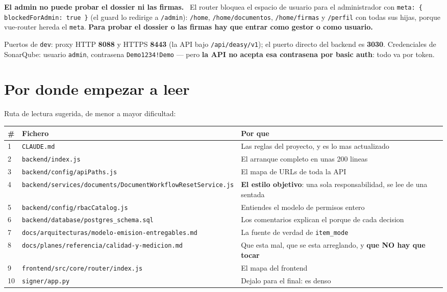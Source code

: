\documentclass[11pt,a4paper,oneside]{report}
\newenvironment{aviso}[1][Aviso]{%
  \par\medskip
  \colorlet{shadecolor}{orange!14}%
  \begin{shaded}\noindent\textbf{\color{orange!45!black}#1.}\ \ignorespaces}%
  {\end{shaded}\par\medskip}
\newcommand{\rt}[1]{\texttt{#1}}
\begin{document}
\begin{aviso}[El admin no puede probar el dossier ni las firmas]
El router bloquea el espacio de usuario para el administrador con
\rt{meta: \{ blockedForAdmin: true \}} (el guard lo redirige a \rt{/admin}): \rt{/home},
\rt{/home/documentos}, \rt{/home/firmas} y \rt{/perfil} con todas sus hijas, porque vue-router
hereda el \rt{meta}. \textbf{Para probar el dossier o las firmas hay que entrar como gestor o
como usuario.}
\end{aviso}

Puertos de \rt{dev}: proxy HTTP \textbf{8088} y HTTPS \textbf{8443} (la API bajo
\rt{/api/deasy/v1}); el puerto directo del backend es \textbf{3030}. Credenciales de SonarQube:
usuario \rt{admin}, contrasena \rt{Demo1234!Demo} --- pero \textbf{la API no acepta esa
contrasena por basic auth}: todo va por token.

\chapter{Por donde empezar a leer}

Ruta de lectura sugerida, de menor a mayor dificultad:

\begin{center}
\footnotesize
\begin{tabularx}{\textwidth}{@{}P{0.8cm}P{6.4cm}L@{}}
\toprule
\textbf{\#} & \textbf{Fichero} & \textbf{Por que} \\
  & \rt{CLAUDE.md} & Las reglas del proyecto, y es lo mas actualizado \\
2  & \rt{backend/index.js} & El arranque completo en unas 200 lineas \\
3  & \rt{backend/config/apiPaths.js} & El mapa de URLs de toda la API \\
4  & \rt{backend/services/documents/DocumentWorkflowResetService.js} & \textbf{El estilo objetivo}: una sola responsabilidad, se lee de una sentada \\
5  & \rt{backend/config/rbacCatalog.js} & Entiendes el modelo de permisos entero \\
6  & \rt{backend/database/postgres\_schema.sql} & Los comentarios explican el porque de cada decision \\
7  & \rt{docs/arquitecturas/modelo-emision-entregables.md} & La fuente de verdad de \rt{item\_mode} \\
8  & \rt{docs/planes/referencia/calidad-y-medicion.md} & Que esta mal, que se esta arreglando, y \textbf{que NO hay que tocar} \\
9  & \rt{frontend/src/core/router/index.js} & El mapa del frontend \\
10 & \rt{signer/app.py} & Dejalo para el final: es denso \\
\bottomrule
\end{tabularx}
\end{center}
\end{document}
